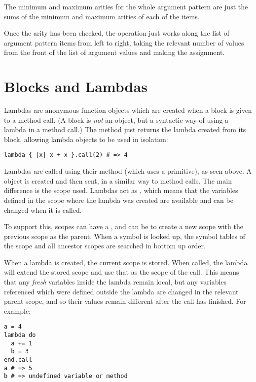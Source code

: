 The minimum and maximum arities for the whole argument pattern are just the sums of the minimum and maximum arities of each of the items.

Once the arity has been checked, the  operation just works along the list of argument pattern items from left to right, taking the relevant number of values from the front of the list of argument values and making the assignment.

\section{Blocks and Lambdas}

Lambdas are anonymous function objects which are created when a block is given to a method call. (A block is \textit{not} an object, but a syntactic way of using a lambda in a method call.) The  method just returns the lambda created from its block, allowing lambda objects to be used in isolation:

\begin{lstlisting}
lambda { |x| x + x }.call(2) # => 4
\end{lstlisting}

Lambdas are called using their  method (which uses a primitive), as seen above. A  object is created and then sent, in a similar way to method calls. The main difference is the scope used. Lambdas act as , which means that the variables defined in the scope where the lambda was created are available and can be changed when it is called.

To support this, scopes can have a , and can be  to create a new scope with the previous scope as the parent. When a symbol is looked up, the symbol tables of the scope and all ancestor scopes are searched in bottom up order.

When a lambda is created, the current scope is stored. When called, the lambda will extend the stored scope and use that as the scope of the call. This means that any \textit{fresh} variables inside the lambda remain local, but any variables referenced which were defined outside the lambda are changed in the relevant parent scope, and so their values remain different after the call has finished. For example:

\begin{lstlisting}
a = 4
lambda do
  a += 1
  b = 3
end.call
a # => 5
b # => undefined variable or method
\end{lstlisting}

